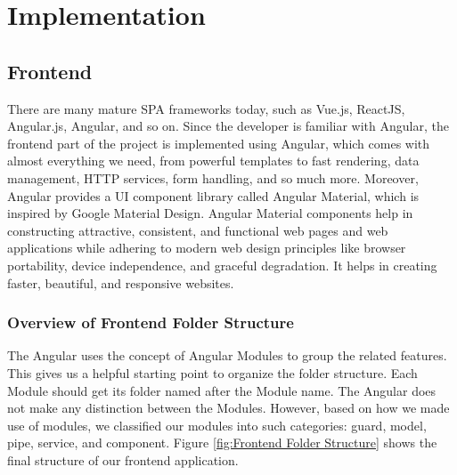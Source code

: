 \section{Implementation}
\label{sec:Implementation}

\subsection{Frontend}
There are many mature SPA frameworks today, such as Vue.js, ReactJS, Angular.js, Angular, and so on. Since the developer is familiar with Angular, the frontend part of the project is implemented using Angular, which comes with almost everything we need, from powerful templates to fast rendering, data management, HTTP services, form handling, and so much more. Moreover, Angular provides a UI component library called Angular Material,
which is inspired by Google Material Design. Angular Material components help in constructing attractive, consistent, and functional web pages and web applications while adhering to modern web design principles like browser portability, device independence, and graceful degradation. It helps in creating faster, beautiful, and responsive websites.

\subsubsection{Overview of Frontend Folder Structure}
The Angular uses the concept of Angular Modules to group the related features. This gives us a helpful starting point to organize the folder structure. Each Module should get its folder named after the Module name. The Angular does not make any distinction between the Modules. However, based on how we made use of modules, we classified our modules into such categories: guard, model, pipe, service, and component. Figure \ref{fig:Frontend Folder Structure} shows the final structure of our frontend application.

